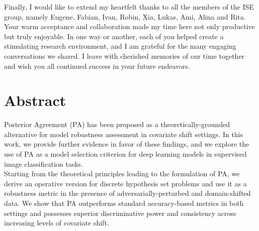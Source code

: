 Finally, I would like to extend my heartfelt thanks to all the members of the ISE group,
namely Eugene, Fabian, Ivan, Robin, Xia, Lukas, Ami, Alina and Rita. Your warm acceptance 
and collaboration made my time here not only productive but truly enjoyable. 
In one way or another, each of you helped create a stimulating research environment, 
and I am grateful for the many engaging conversations we shared. I leave with 
cherished memories of our time together and wish you all continued success in your 
future endeavors. \\
 
 \cleardoublepage


 \setcounter{tocdepth}{2}
 \tableofcontents

 \cleardoublepage


\chapter*{Abstract}

 Posterior Agreement (PA) has been proposed as a theoretically-grounded alternative 
 for model robustness assessment in covariate shift settings. In this work, we provide 
 further evidence in favor of these findings, and we explore the use of PA as a model 
 selection criterion for deep learning models in supervised image classification tasks. \\
 
 Starting from the theoretical principles leading to the formulation of PA, we derive an
 operative version for discrete hypothesis set problems and use it as a robustness metric 
 in the presence of adversarially-perturbed and domain-shifted data. We show that PA outperforms 
 standard accuracy-based metrics in both settings and possesses superior discriminative 
 power and consistency across increasing levels of covariate shift. \\

 \cleardoublepage




